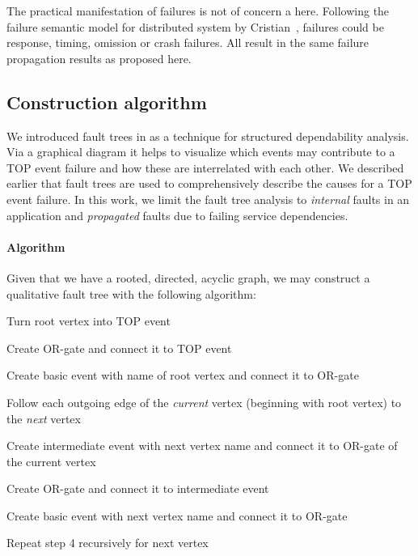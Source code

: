 The practical manifestation of failures is not of concern a here. Following the failure semantic model for distributed system by Cristian~\cite{cristian}, failures could be response, timing, omission or crash failures. All result in the same failure propagation results as proposed here.


\subsection{Construction algorithm}
\label{subsec:fault_tree_construction}

We introduced fault trees in  as a technique for structured dependability analysis. Via a graphical diagram it helps to visualize which events may contribute to a TOP event failure and how these are interrelated with each other. We described earlier that fault trees are used to comprehensively describe the causes for a TOP event failure. In this work, we limit the fault tree analysis to \emph{internal} faults in an application and \emph{propagated} faults due to failing service dependencies.

\paragraph{Algorithm}

Given that we have a rooted, directed, acyclic graph, we may construct a qualitative fault tree with the following algorithm:

\begin{tenumerate}
  \item Turn root vertex into TOP event
  \item Create OR-gate and connect it to TOP event
  \item Create basic event with name of root vertex and connect it to OR-gate
  \item Follow each outgoing edge of the \emph{current} vertex (beginning with root vertex) to the \emph{next} vertex
  \begin{tenumerate}
    \item Create intermediate event with next vertex name and connect it to OR-gate of the current vertex
    \item Create OR-gate and connect it to intermediate event
    \item Create basic event with next vertex name and connect it to OR-gate
    \item Repeat step 4 recursively for next vertex
  \end{tenumerate}
\end{tenumerate}

